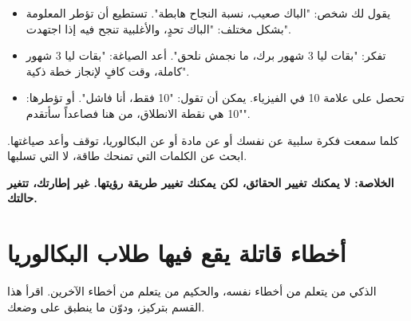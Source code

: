 \documentclass[12pt,a4paper]{book}
\newcommand{\importantAr}[1]{%
	\begin{important}
		\bfseries #1
	\end{important}
}
\begin{document}
	\begin{itemize}
		\item يقول لك شخص: "الباك صعيب، نسبة النجاح هابطة". تستطيع أن تؤطر المعلومة بشكل مختلف: "الباك تحدٍ، والأغلبية تنجح فيه إذا اجتهدت".
		
		\item تفكر: "بقات ليا 3 شهور برك، ما نجمش نلحق". أعد الصياغة: "بقات ليا 3 شهور كاملة، وقت كافٍ لإنجاز خطة ذكية".
		
		\item تحصل على علامة 10 في الفيزياء. يمكن أن تقول: "10 فقط، أنا فاشل". أو تؤطرها: "10 هي نقطة الانطلاق، من هنا فصاعداً سأتقدم".
	\end{itemize}

	كلما سمعت فكرة سلبية عن نفسك أو عن مادة أو عن البكالوريا، توقف وأعد صياغتها. ابحث عن الكلمات التي تمنحك طاقة، لا التي تسلبها.
	
	\importantAr{الخلاصة: لا يمكنك تغيير الحقائق، لكن يمكنك تغيير طريقة رؤيتها. غير إطارتك، تتغير حالتك.}
	
	\section{أخطاء قاتلة يقع فيها طلاب البكالوريا}
	\label{sec:owner-experiences4}
	
	الذكي من يتعلم من أخطاء نفسه، والحكيم من يتعلم من أخطاء الآخرين. اقرأ هذا القسم بتركيز، ودوّن ما ينطبق على وضعك.
	
\end{document}
